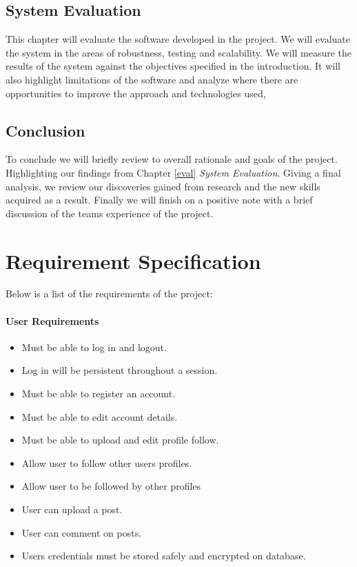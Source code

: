 \subsection{System Evaluation}
This chapter will evaluate the software developed in the project. We will evaluate the system in the areas of robustness, testing and scalability. We will measure the results of the system against the objectives specified in the introduction. It will also highlight limitations of the software and analyze where there are opportunities to improve the approach and technologies used,

\subsection{Conclusion}
To conclude we will briefly review to overall rationale and goals of the project. Highlighting our findings from  Chapter \ref{eval} \textit{System Evaluation}. Giving a final analysis, we review our discoveries gained from research and the new skills acquired as a result. Finally we will finish on a positive note with a brief discussion of the teams experience of the project.

\section{Requirement Specification}
Below is a list of the requirements of the project:

\paragraph{User Requirements} \label{userreq}
\begin{itemize}
    \item Must be able to log in and logout.
    \item Log in will be persistent throughout a session. 
    \item Must be able to register an account.
    \item Must be able to edit account details.
    \item Must be able to upload and edit profile follow.
    \item Allow user to follow other users profiles.
    \item Allow user to be followed by other profiles
    \item User can upload a post.
    \item User can comment on posts.
    \item Users credentials must be stored safely and encrypted on database.
\end{itemize}